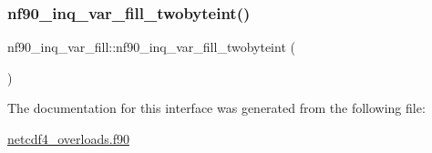 \subsubsection{\texorpdfstring{nf90\+\_\+inq\+\_\+var\+\_\+fill\+\_\+twobyteint()}{nf90\_inq\_var\_fill\_twobyteint()}}
{\footnotesize\ttfamily nf90\+\_\+inq\+\_\+var\+\_\+fill\+::nf90\+\_\+inq\+\_\+var\+\_\+fill\+\_\+twobyteint (\begin{DoxyParamCaption}{ }\end{DoxyParamCaption})}



The documentation for this interface was generated from the following file\+:\begin{DoxyCompactItemize}
\item 
\hyperlink{netcdf4__overloads_8f90}{netcdf4\+\_\+overloads.\+f90}\end{DoxyCompactItemize}
